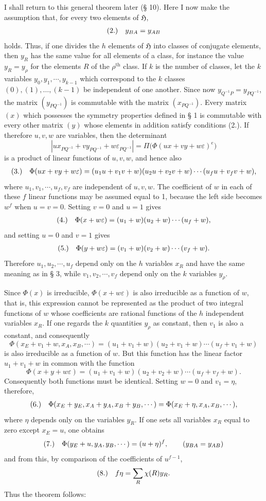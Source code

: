 \documentclass[11pt]{article}
\makeatletter
\newcommand{\Hgrp}{\mathfrak{H}}
\newcommand{\frobtagc}[2]{\[\begin{array}{@{}r@{\quad}c@{}}\textup{(#1)} & \displaystyle #2\end{array}\]}
\makeatother
\begin{document}
I shall return to this general theorem later (§ 10). Here I now make the assumption that, for every two elements of $\Hgrp$,
\frobtagc{2.}{y_{BA}=y_{AB}}
holds. Thus, if one divides the $h$ elements of $\Hgrp$ into classes of conjugate elements, then $y_R$ has the same value for all elements of a class, for instance the value $y_R=y_\rho$ for the elements $R$ of the $\rho^{\mathrm{th}}$ class. If $k$ is the number of classes, let the $k$ variables $y_0,y_1,\cdots,y_{k-1}$ which correspond to the $k$ classes $(0),(1),\ldots,(k-1)$ be independent of one another. Since now $y_{Q^{-1}P}=y_{PQ^{-1}}$, the matrix $(y_{PQ^{-1}})$ is commutable with the matrix $(x_{PQ^{-1}})$. Every matrix $(x)$ which possesses the symmetry properties defined in § 1 is commutable with every other matrix $(y)$ whose elements in addition satisfy conditions (2.). If therefore $u,v,w$ are variables, then the determinant
\[
|ux_{PQ^{-1}}+vy_{PQ^{-1}}+w\varepsilon_{PQ^{-1}}|=\Pi\bigl(\Phi(ux+vy+w\varepsilon)^e\bigr)
\]
is a product of linear functions of $u,v,w$, and hence also
\frobtagc{3.}{\Phi(ux+vy+w\varepsilon)=(u_1u+v_1v+w)(u_2u+v_2v+w)\cdots(u_fu+v_fv+w),}
where $u_1,v_1,\cdots,u_f,v_f$ are independent of $u,v,w$. The coefficient of $w$ in each of these $f$ linear functions may be assumed equal to 1, because the left side becomes $w^f$ when $u=v=0$. Setting $v=0$ and $u=1$ gives
\frobtagc{4.}{\Phi(x+w\varepsilon)=(u_1+w)(u_2+w)\cdots(u_f+w),}
and setting $u=0$ and $v=1$ gives
\frobtagc{5.}{\Phi(y+w\varepsilon)=(v_1+w)(v_2+w)\cdots(v_f+w).}
Therefore $u_1,u_2,\cdots,u_f$ depend only on the $h$ variables $x_R$ and have the same meaning as in § 3, while $v_1,v_2,\cdots,v_f$ depend only on the $k$ variables $y_\rho$.

Since $\Phi(x)$ is irreducible, $\Phi(x+w\varepsilon)$ is also irreducible as a function of $w$, that is, this expression cannot be represented as the product of two integral functions of $w$ whose coefficients are rational functions of the $h$ independent variables $x_R$. If one regards the $k$ quantities $y_\rho$ as constant, then $v_1$ is also a constant, and consequently
\[
\Phi(x_E+v_1+w,x_A,x_B,\cdots)=(u_1+v_1+w)(u_2+v_1+w)\cdots(u_f+v_1+w)
\]
is also irreducible as a function of $w$. But this function has the linear factor $u_1+v_1+w$ in common with the function
\[
\Phi(x+y+w\varepsilon)=(u_1+v_1+w)(u_2+v_2+w)\cdots(u_f+v_f+w).
\]
Consequently both functions must be identical. Setting $w=0$ and $v_1=\eta$, therefore,
\frobtagc{6.}{\Phi(x_E+y_E,x_A+y_A,x_B+y_B,\cdots)=\Phi(x_E+\eta,x_A,x_B,\cdots),}
where $\eta$ depends only on the variables $y_R$. If one sets all variables $x_R$ equal to zero except $x_E=u$, one obtains
\frobtagc{7.}{\Phi(y_E+u,y_A,y_B,\cdots)=(u+\eta)^f,\qquad(y_{BA}=y_{AB})}
and from this, by comparison of the coefficients of $u^{f-1}$,
\frobtagc{8.}{f\eta=\sum_R\chi(R)y_R.}
Thus the theorem follows:
\end{document}
